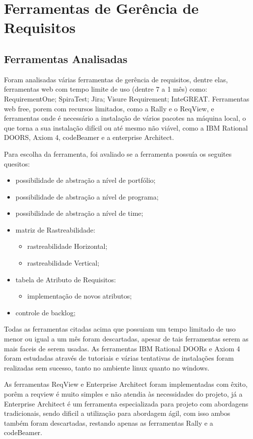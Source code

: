 \section{Ferramentas de Gerência de Requisitos}
	
	\subsection{Ferramentas Analisadas}
		Foram analisadas várias ferramentas de gerência de requisitos, dentre elas, ferramentas web com tempo limite de uso (dentre 7 a 1 mês) como: RequirementOne; SpiraTest; Jira; Visure Requirement; InteGREAT. Ferramentas web free, porem com recursos limitados, como a Rally e o ReqView, e ferramentas onde é necessário a instalação de vários pacotes na máquina local, o que torna a sua instalação difícil ou até mesmo não viável, como a IBM Rational DOORS, Axiom 4, codeBeamer e a enterprise Architect.
		\par Para escolha da ferramenta, foi avaliado se a ferramenta possuía os seguites quesitos:
		\begin{itemize}
		\item possibilidade de abstração a nível de portfólio;
		\item possibilidade de abstração a nível de programa;
		\item possibilidade de abstração a nível de time;
		\item matriz de Rastreabilidade:
			\begin{itemize}
			\item rastreabilidade Horizontal;
			\item rastreabilidade Vertical;
			\end{itemize}
		\item tabela de Atributo de Requisitos:
			\begin{itemize}
			\item implementação de novos atributos;
			\end{itemize}
		\item controle de backlog;
		\end{itemize}
		
		\par
		Todas as ferramentas citadas acima que possuiam um tempo limitado de uso menor ou igual a um mês foram descartadas, apesar de tais ferramentas serem as mais faceis de serem usadas. As ferramentas IBM Rational DOORs e Axiom 4 foram estudadas através de tutoriais e várias tentativas de instalações foram realizadas sem sucesso, tanto no ambiente linux quanto no windows.
		\par
		As ferramentas ReqView e Enterprise Architect foram implementadas com êxito, porêm a reqview é muito simples e não atendia às necessidades do projeto, já a Enterprise Architect é um ferramenta especializada para projeto com abordagens tradicionais, sendo dificil a utilização para abordagem ágil, com isso ambos também foram descartadas, restando apenas as ferramentas Rally e a codeBeamer.\\

